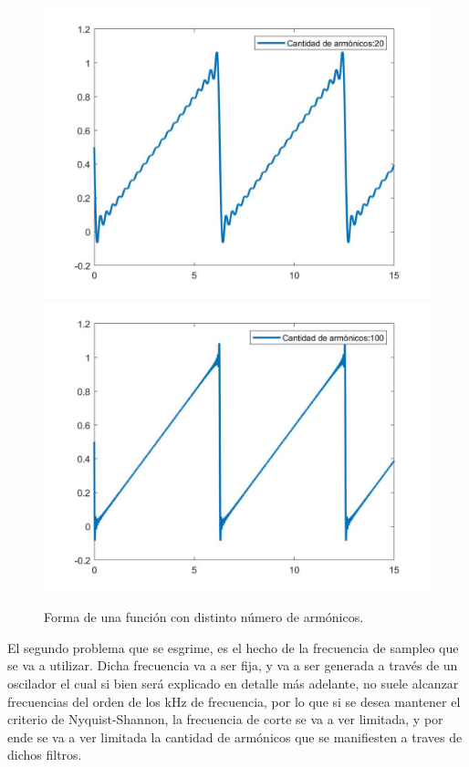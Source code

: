 \documentclass[../../ASSD_TP1_G7.tex]{subfiles}
\begin{document}
\begin{figure}[H]
\begin{centering}
\includegraphics[scale=0.25]{Imagenes/20armonicos}\includegraphics[scale=0.25]{Imagenes/100armonicos}\caption{Forma de una función con distinto número de armónicos.\label{fig:Forma-de-una}}
\par\end{centering}
\end{figure}

El segundo problema que se esgrime, es el hecho de la frecuencia de
sampleo que se va a utilizar. Dicha frecuencia va a ser fija, y va
a ser generada a través de un oscilador el cual si bien será explicado
en detalle más adelante, no suele alcanzar frecuencias del orden de
los kHz de frecuencia, por lo que si se desea mantener el criterio
de Nyquist-Shannon, la frecuencia de corte se va a ver limitada, y
por ende se va a ver limitada la cantidad de armónicos que se manifiesten
a traves de dichos filtros.
\end{document}
